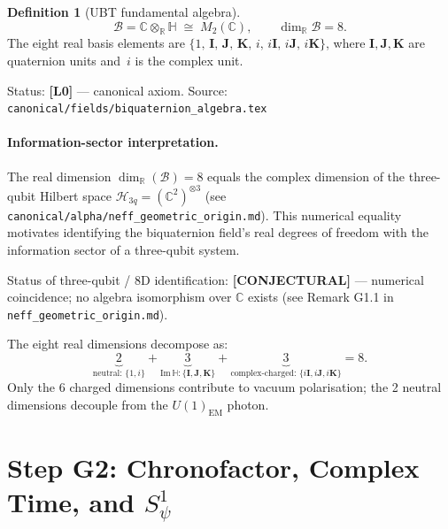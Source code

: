 \documentclass[12pt,a4paper]{article}
\theoremstyle{definition}
\newtheorem{definition}[theorem]{Definition}
\theoremstyle{remark}
\begin{document}
\begin{definition}[UBT fundamental algebra]
\label{def:g5:algebra}
\begin{equation}
  \mathcal{B} = \mathbb{C}\otimes_\mathbb{R}\mathbb{H} \;\cong\; M_2(\mathbb{C}),
  \qquad
  \dim_\mathbb{R}\mathcal{B} = 8.
  \label{eq:g5:algebra}
\end{equation}
The eight real basis elements are $\{1,\,\mathbf{I},\,\mathbf{J},\,\mathbf{K},
\,i,\,i\mathbf{I},\,i\mathbf{J},\,i\mathbf{K}\}$, where $\mathbf{I,J,K}$ are
quaternion units and~$i$ is the complex unit.
\end{definition}

\begin{resultbox}
Status: \textbf{[L0]} — canonical axiom.  Source: \texttt{canonical/fields/biquaternion\_algebra.tex}
\end{resultbox}

\paragraph{Information-sector interpretation.}
The real dimension $\dim_\mathbb{R}(\mathcal{B}) = 8$ equals the complex dimension
of the three-qubit Hilbert space $\mathcal{H}_{3q} = (\mathbb{C}^2)^{\otimes 3}$
(see \texttt{canonical/alpha/neff\_geometric\_origin.md}).  This numerical equality
motivates identifying the biquaternion field's real degrees of freedom with the
information sector of a three-qubit system.

\begin{statusbox}
Status of three-qubit / 8D identification: \textbf{[CONJECTURAL]} — numerical
coincidence; no algebra isomorphism over $\mathbb{C}$ exists (see Remark G1.1 in
\texttt{neff\_geometric\_origin.md}).
\end{statusbox}

The eight real dimensions decompose as:
\begin{equation}
  \underbrace{2}_{\text{neutral: }\{1,i\}}
  + \underbrace{3}_{\mathrm{Im}\,\mathbb{H}:\{\mathbf{I,J,K}\}}
  + \underbrace{3}_{\text{complex-charged: }\{i\mathbf{I},i\mathbf{J},i\mathbf{K}\}}
  = 8.
  \label{eq:g5:decomp}
\end{equation}
Only the 6 charged dimensions contribute to vacuum polarisation; the 2 neutral
dimensions decouple from the $U(1)_\mathrm{EM}$ photon.

\section{Step G2: Chronofactor, Complex Time, and $S^1_\psi$}
\label{sec:g5:chron}
\end{document}
